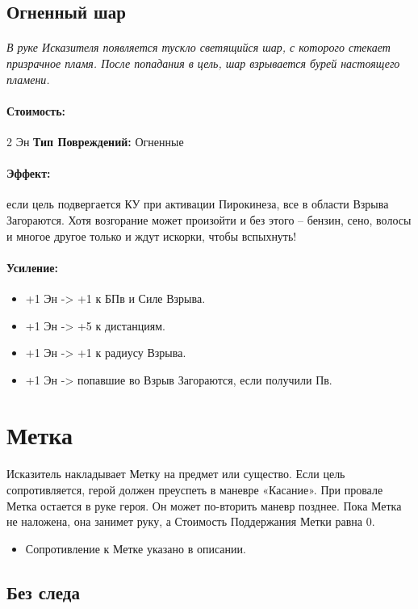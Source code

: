\subsection{Огненный шар}
\paragraph{} 
\textit{В руке Исказителя появляется тускло светящийся шар, с которого стекает призрачное пламя. После попадания в цель, шар взрывается бурей настоящего пламени.}
\paragraph{Стоимость: }2 Эн
\newline
\textbf{Тип Повреждений: }Огненные
\paragraph{Эффект: }если цель подвергается КУ при активации Пирокинеза, все в области Взрыва Загораются. Хотя возгорание может произойти и без этого – бензин, сено, волосы и многое другое только и ждут искорки, чтобы вспыхнуть!
\paragraph{Усиление:}
\begin{itemize}
\item+1 Эн -> +1 к БПв и Силе Взрыва.
\item+1 Эн -> +5 к дистанциям.
\item+1 Эн -> +1 к радиусу Взрыва.
\item+1 Эн -> попавшие во Взрыв Загораются, если получили Пв.
\end{itemize}
\section{Метка}Исказитель накладывает Метку на предмет или существо. Если цель сопротивляется, герой должен преуспеть в маневре «Касание». При провале Метка остается в руке героя. Он может по-вторить маневр позднее. Пока Метка не наложена, она занимет руку, а Стоимость Поддержания Метки равна 0.
\begin{itemize}
\item Сопротивление к Метке указано в описании.
\end{itemize}
\subsection{Без следа}
